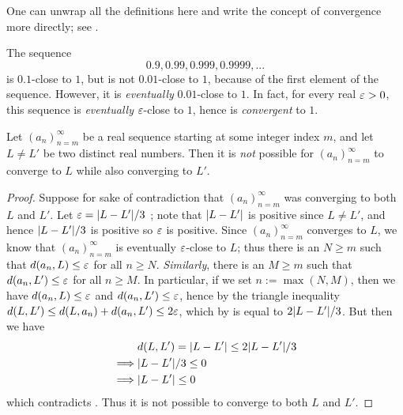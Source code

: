 \begin{note}
One can unwrap all the definitions here and write the concept of convergence more directly; see .
\end{note}

\begin{example} \label{examples 6.1.6}
The sequence
\[
    0.9, 0.99, 0.999, 0.9999,...
\]
is \(0.1\)-close to \(1\), but is not \(0.01\)-close to \(1\), because of the first element of the sequence.
However, it is \emph{eventually} \(0.01\)-close to \(1\).
In fact, for every real \(\varepsilon > 0\), this sequence is \emph{eventually} \(\varepsilon\)-close to \(1\), hence is \emph{convergent} to \(1\).
\end{example}

\begin{proposition}  \label{prop 6.1.7}
Let \((a_n)_{n = m}^{\infty}\) be a real sequence starting at some integer index \(m\),
and let \(L \neq L'\) be two distinct real numbers.
Then it is \emph{not} possible for \((a_n)_{n = m}^{\infty}\) to converge to \(L\) while also converging to \(L'\).
\end{proposition}

\begin{proof}
Suppose for sake of contradiction that \((a_n)_{n = m}^{\infty}\) was converging to both \(L\) and \(L'\).
Let \(\varepsilon = \lvert L - L'\rvert/3\) \MAROON{(*)};
note that \(\lvert L - L'\rvert\) is positive \MAROON{(**)} since \(L \neq L'\), and hence \(\lvert L - L'\rvert/3\) is positive so \(\varepsilon\) is positive.
Since \((a_n)_{n = m}^{\infty}\) converges to \(L\), we know that \((a_n)_{n = m}^{\infty}\) is eventually \(\varepsilon\)-close to \(L\);
thus there is an \(N \ge m\) such that \(d(a_n, L) \le \varepsilon\) for all \(n \ge N\).
\emph{Similarly}, there is an \(M \ge m\) such that \(d(a_n, L') \le \varepsilon\) for all \(n \ge M\).
In particular, if we set \(n := \max(N, M)\), then we have \(d(a_n, L) \le \varepsilon\) and \(d(a_n, L') \le \varepsilon\), hence by the triangle inequality \(d(L,L') \le d(L, a_n) + d(a_n, L') \le 2\varepsilon\), which by \MAROON{(*)} is equal to \(2\lvert L - L'\rvert/3\).
But then we have
\begin{align*}
             & d(L, L') = \lvert L - L'\rvert \le 2\lvert L - L'\rvert/3 \\
    \implies & \lvert L - L'\rvert/3 \le 0 \\
    \implies & \lvert L - L'\rvert \le 0
\end{align*}
which contradicts \MAROON{(**)}.
Thus it is not possible to converge to both \(L\) and \(L'\).
\end{proof}

